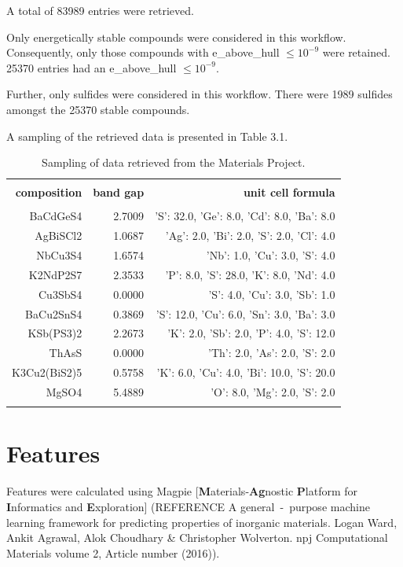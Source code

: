 \documentclass[10pt, letter]{report}
\renewcommand{\=}{\, =\, }
\newcommand{\+}{\, +\, }
\renewcommand{\-}{\, -\, }
\begin{document}
A total of 83989 entries were retrieved.

Only energetically stable compounds were considered in this workflow. Consequently, only those compounds with e\_above\_hull \(\leq 10^{-9}\) were retained. 25370 entries had an e\_above\_hull \(\leq 10^{-9}\).

Further, only sulfides were considered in this workflow. There were 1989 sulfides amongst the 25370 stable compounds.

A sampling of the retrieved data is presented in Table 3.1.


\begin{table}[H]
\begin{center}
\begin{tabular}{rrr}
\toprule
&&\\
{\bf composition} & {\bf band gap} & {\bf unit cell formula}\\
\midrule
&&\\
BaCdGeS4  &   2.7009 & {'S': 32.0, 'Ge': 8.0, 'Cd': 8.0, 'Ba': 8.0} \\
AgBiSCl2 &  1.0687  & {'Ag': 2.0, 'Bi': 2.0, 'S': 2.0, 'Cl': 4.0} \\
NbCu3S4  & 1.6574     &        {'Nb': 1.0, 'Cu': 3.0, 'S': 4.0} \\
K2NdP2S7 &  2.3533  & {'P': 8.0, 'S': 28.0, 'K': 8.0, 'Nd': 4.0} \\ 
Cu3SbS4 &  0.0000    &         {'S': 4.0, 'Cu': 3.0, 'Sb': 1.0} \\
BaCu2SnS4 &  0.3869 & {'S': 12.0, 'Cu': 6.0, 'Sn': 3.0, 'Ba': 3.0} \\
KSb(PS3)2 &  2.2673   & {'K': 2.0, 'Sb': 2.0, 'P': 4.0, 'S': 12.0} \\
ThAsS &  0.0000         &    {'Th': 2.0, 'As': 2.0, 'S': 2.0} \\
K3Cu2(BiS2)5 &  0.5758 & {'K': 6.0, 'Cu': 4.0, 'Bi': 10.0, 'S': 20.0} \\
MgSO4 &  5.4889          &    {'O': 8.0, 'Mg': 2.0, 'S': 2.0} \\
&&\\
\bottomrule
\end{tabular}
\end{center}
\caption{Sampling of data retrieved from the Materials Project.}
\end{table}

\section{Features}
Features were calculated using Magpie [\textbf{M}aterials-\textbf{Ag}nostic \textbf{P}latform for \textbf{I}nformatics and \textbf{E}xploration] (REFERENCE\: A general\-purpose machine learning framework for predicting properties of inorganic materials. Logan Ward, Ankit Agrawal, Alok Choudhary \& Christopher Wolverton. npj Computational Materials volume 2, Article number (2016)).
\end{document}
